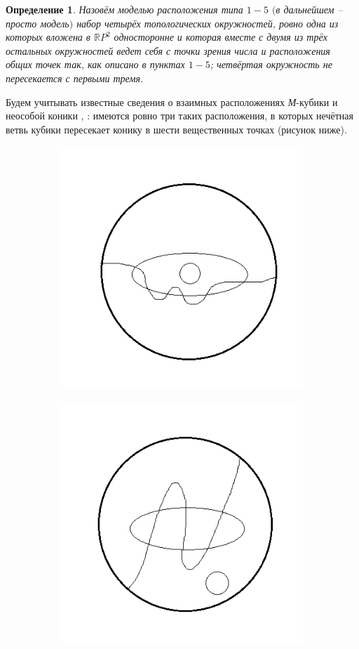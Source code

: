 \documentclass[14pt]{article}
\newtheorem{definition}{Определение}
\begin{document}
\begin{definition}
Назовём моделью расположения типа $1-5$ $($в дальнейшем -- просто модель$)$ набор четырёх топологических окружностей, ровно одна из которых вложена в $\mathbb RP^2$ односторонне и которая вместе с двумя из трёх остальных окружностей ведет себя с точки зрения числа и расположения общих точек так, как описано в пунктах $1-5$; четвёртая окружность не пересекается с первыми тремя.
\end{definition}

Будем учитывать известные сведения о взаимных расположениях \textit{М}-кубики и неособой коники \cite{litlink2}, \cite{litlink3}: имеются ровно три таких расположения, в которых нечётная ветвь кубики пересекает конику в шести вещественных точках (рисунок ниже).


\begin{figure}[H]
     \begin{subfigure}[b]{0.2\textwidth}
    \centering
    \includegraphics[scale=0.5]{loc_odd_brunch_1.png}
    \caption{}
  \end{subfigure}
  \hspace{2cm}
  \begin{subfigure}[b]{0.2\textwidth}
    \centering
    \includegraphics[scale=0.5]{loc_odd_brunch_2.png}

\end{subfigure}
\end{figure}
\end{document}
